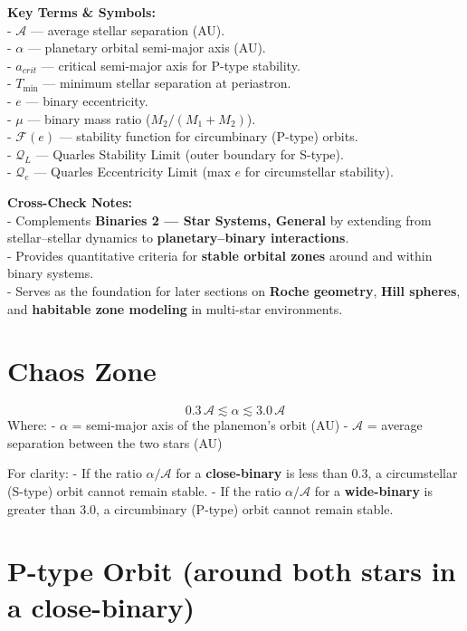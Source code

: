 \documentclass[
  letterpaper,
]{book}
\begin{document}
\textbf{Key Terms \& Symbols:}\\
- \textbf{\(\mathcal{A}\)} --- average stellar separation (AU).\\
- \textbf{\(\alpha\)} --- planetary orbital semi-major axis (AU).\\
- \textbf{\(a_{crit}\)} --- critical semi-major axis for P-type
stability.\\
- \textbf{\(T_{\min}\)} --- minimum stellar separation at periastron.\\
- \textbf{\(e\)} --- binary eccentricity.\\
- \textbf{\(\mu\)} --- binary mass ratio (\(M_2 / (M_1 + M_2)\)).\\
- \textbf{\(\mathcal{F}(e)\)} --- stability function for circumbinary
(P-type) orbits.\\
- \textbf{\(\mathcal{Q}_L\)} --- Quarles Stability Limit (outer boundary
for S-type).\\
- \textbf{\(\mathcal{Q}_e\)} --- Quarles Eccentricity Limit (max \(e\)
for circumstellar stability).

\textbf{Cross-Check Notes:}\\
- Complements \textbf{Binaries 2 --- Star Systems, General} by extending
from stellar--stellar dynamics to \textbf{planetary--binary
interactions}.\\
- Provides quantitative criteria for \textbf{stable orbital zones}
around and within binary systems.\\
- Serves as the foundation for later sections on \textbf{Roche
geometry}, \textbf{Hill spheres}, and \textbf{habitable zone modeling}
in multi-star environments.

\section{Chaos Zone}\label{chaos-zone}

\[
0.3\,\mathcal{A} \lesssim \alpha \lesssim 3.0\,\mathcal{A}
\] Where: - \(\alpha\) = semi-major axis of the planemon's orbit (AU) -
\(\mathcal{A}\) = average separation between the two stars (AU)

For clarity: - If the ratio \(\alpha/\mathcal{A}\) for a
\textbf{close-binary} is less than 0.3, a circumstellar (S-type) orbit
cannot remain stable. - If the ratio \(\alpha/\mathcal{A}\) for a
\textbf{wide-binary} is greater than 3.0, a circumbinary (P-type) orbit
cannot remain stable.

\section{P-type Orbit (around both stars in a
close-binary)}\label{p-type-orbit-around-both-stars-in-a-close-binary}
\end{document}
